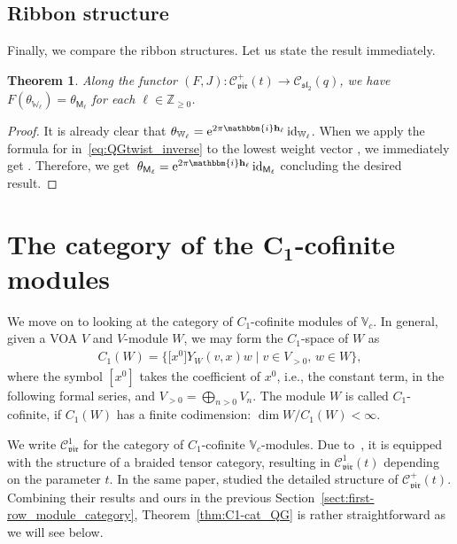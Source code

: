 \documentclass[10pt,a4paper]{amsart}
\numberwithin{equation}{section}
\newtheorem{thm}{Theorem}[section]
\newcommand{\id}{\operatorname{id}}
\newcommand{\bZ}{\mathbb{Z}}
\newcommand{\cC}{\mathcal{C}}
\newcommand{\fsl}{\mathfrak{sl}}
\newcommand{\sfM}{\mathsf{M}}
\newcommand{\bbmi}{\mathbbm{i}}
\newcommand{\QGirrep}[1]{\sfM_{#1}}
\newcommand{\QGirvec}[2]{u^{(#1)}_{#2}}
\newcommand{\catQG}{\cC_{\fsl_{2}}}
\newcommand{\catVir}{\cC_{\vir}}
\newcommand{\voaV}{V}
\newcommand{\voagen}{V}
\newcommand{\voamodgen}{W}
\newcommand{\voaY}{Y}
\newcommand{\voavec}{v}
\newcommand{\vmodvec}{w}
\newcommand{\virvoa}{\mathbb{V}}
\newcommand{\virmod}{\mathbb{W}}
\newcommand{\vir}{\mathfrak{vir}}
\newcommand{\frweight}[1]{\mathbf{h}_{#1}}
\begin{document}
\subsection{Ribbon structure}
Finally, we compare the ribbon structures.
Let us state the result immediately.
\begin{thm}
Along the functor $(F,J) \colon \catVir^{+}(t)\to\catQG(q)$, we have
$
 F(\theta_{\virmod_{\ell}})=\theta_{\QGirrep{\ell}}
$
for each $\ell\in\bZ_{\geq 0}$.
\end{thm}
\begin{proof}
It is already clear that $\theta_{\virmod_{\ell}}={\rm e}^{2\pi\bbmi \frweight{\ell}}\id_{\virmod_{\ell}}$.
When we apply the formula for \smash{$\theta_{\QGirrep{\ell}}^{-1}$} in~\eqref{eq:QGtwist_inverse} to the lowest weight vector \smash{$\QGirvec{\ell}{\ell}$}, we immediately get
\smash{$
 \theta_{\QGirrep{\ell}}^{-1} \QGirvec{\ell}{\ell}={\rm e}^{-2\pi\bbmi \frweight{\ell}}\QGirvec{\ell}{\ell}$}.
Therefore, we get~${\theta_{\QGirrep{\ell}}={\rm e}^{2\pi\bbmi \frweight{\ell}}\id_{\QGirrep{\ell}}}$ concluding the desired result.
\end{proof}



\section[The category of the C\_1-cofinite modules]{The category of the $\boldsymbol{ C_{1}}$-cofinite modules}
\label{sect:C1-cofinite_module_category}
We move on to looking at the category of $C_{1}$-cofinite modules of $\virvoa_{c}$.
In general, given a VOA $\voagen$ and $\voagen$-module $\voamodgen$,
we may form the $C_{1}$-space of $\voamodgen$ as
\begin{gather*}
	C_{1}(\voamodgen) = \bigl\{\bigl[x^{0}\bigr]\voaY_{\voamodgen}(\voavec,x)\vmodvec\mid \voavec\in\voagen_{>0}, \, \vmodvec \in \voamodgen\bigr\},
\end{gather*}
where the symbol $[x^{0}]$ takes the coefficient of $x^{0}$, i.e., the constant term, in the following formal series, and $\voaV_{>0} = \bigoplus_{n>0} \voaV_{n}$.
The module $\voamodgen$ is called $C_{1}$-cofinite, if $C_{1}(W)$ has a finite codimension: $\dim \voamodgen/C_{1}(\voamodgen)<\infty$.

We write $\catVir^{1}$ for the category of $C_{1}$-cofinite $\virvoa_{c}$-modules.
Due to~\cite{CJORY-tensor_categories_arising_from_Virasoro_algebra}, it is equipped with the structure of a braided tensor category,
resulting in $\catVir^{1}(t)$ depending on the parameter $t$.
In the same paper, \cite{CJORY-tensor_categories_arising_from_Virasoro_algebra} studied the detailed structure of $\catVir^{+}(t)$.
Combining their results and ours in the previous Section~\ref{sect:first-row_module_category},
Theorem~\ref{thm:C1-cat_QG} is rather straightforward as we will see below.
\end{document}
